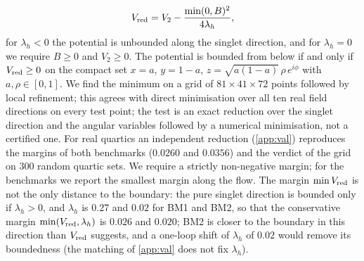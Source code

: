 \documentclass[twocolumn,epjc3]{svjour3}
\begin{document}
\begin{equation}
V_{\rm red}=V_2-\frac{\min(0,B)^2}{4\lambda_h},
\label{eq:vred}
\end{equation}
for $\lambda_h<0$ the potential is unbounded along the singlet direction, and for $\lambda_h=0$ we require $B\ge0$ and $V_2\ge0$. The potential is bounded from below if and only if $V_{\rm red}\ge0$ on the compact set $x=a$, $y=1-a$, $z=\sqrt{a(1-a)}\,\rho\,e^{i\phi}$ with $a,\rho\in[0,1]$. We find the minimum on a grid of $81\times41\times72$ points followed by local refinement; this agrees with direct minimisation over all ten real field directions on every test point; the test is an exact reduction over the singlet direction and the angular variables followed by a numerical minimisation, not a certified one. For real quartics an independent reduction (\ref{app:val}) reproduces the margins of both benchmarks ($0.0260$ and $0.0356$) and the verdict of the grid on $300$ random quartic sets. We require a strictly non-negative margin; for the benchmarks we report the smallest margin along the flow. The margin $\min V_{\rm red}$ is not the only distance to the boundary: the pure singlet direction is bounded only if $\lambda_h>0$, and $\lambda_h$ is $0.27$ and $0.02$ for BM1 and BM2, so that the conservative margin $\min(V_{\rm red},\lambda_h)$ is $0.026$ and $0.020$; BM2 is closer to the boundary in this direction than $V_{\rm red}$ suggests, and a one-loop shift of $\lambda_h$ of $0.02$ would remove its boundedness (the matching of \ref{app:val} does not fix $\lambda_h$).
\end{document}
